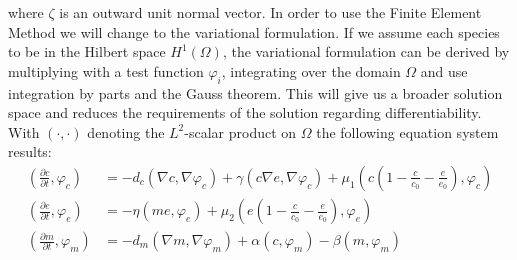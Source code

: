 where $\zeta$ is an outward unit normal vector.\newline 
In order to use the Finite Element Method we will change to the variational formulation. If we assume each species to be in the Hilbert space $H^1(\Omega)$, the variational formulation can be derived by multiplying with a test function $\varphi_i$, integrating over the domain $\Omega$ and use integration by parts and the Gauss theorem. This will give us a broader solution space and reduces the requirements of the solution regarding differentiability. With $\left(\cdot, \cdot\right)$ denoting the $L^2$-scalar product on $\Omega$ the following equation system results:
\begin{align}
    \left(\frac{\partial c}{\partial t}, \varphi_c\right) &=
        - d_c\left(\nabla c, \nabla \varphi_c\right) + \gamma \left(c\nabla e, \nabla \varphi_c\right) + \mu_1 \left(c \left(1-\frac{c}{c_0} - \frac{e}{e_0}\right), \varphi_c\right) \label{eq:11}\\
    \left(\frac{\partial e}{\partial t}, \varphi_e\right) &=  -\eta \left( me, \varphi_e\right) + \mu_2 \left(e\left(1-\frac{c}{c_0}-\frac{e}{e_0}\right),\varphi_e\right) \label{eq:12}\\
    \left(\frac{\partial m}{\partial t}, \varphi_m\right) &= -d_m \left(\nabla m,\nabla \varphi_m\right) + \alpha \left(c,\varphi_m\right) - \beta \left(m,\varphi_m\right) \label{eq:13}
\end{align}

